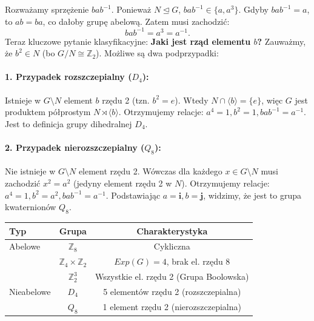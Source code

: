 Rozważamy sprzężenie $bab^{-1}$. Ponieważ $N \unlhd G$, $bab^{-1} \in \{a, a^3\}$.
Gdyby $bab^{-1} = a$, to $ab=ba$, co dałoby grupę abelową. Zatem musi zachodzić:
\[ bab^{-1} = a^3 = a^{-1}. \]
Teraz kluczowe pytanie klasyfikacyjne: \textbf{Jaki jest rząd elementu $b$?}
Zauważmy, że $b^2 \in N$ (bo $G/N \cong \mathbb{Z}_2$). Możliwe są dwa podprzypadki:

\paragraph{1. Przypadek rozszczepialny ($D_4$):}
Istnieje w $G \setminus N$ element $b$ rzędu 2 (tzn. $b^2 = e$).
Wtedy $N \cap \langle b \rangle = \{e\}$, więc $G$ jest produktem półprostym $N \rtimes \langle b \rangle$.
Otrzymujemy relacje: $a^4=1, b^2=1, bab^{-1}=a^{-1}$.
Jest to definicja grupy dihedralnej $D_4$.

\paragraph{2. Przypadek nierozszczepialny ($Q_8$):}
Nie istnieje w $G \setminus N$ element rzędu 2.
Wówczas dla każdego $x \in G \setminus N$ musi zachodzić $x^2 = a^2$ (jedyny element rzędu 2 w $N$).
Otrzymujemy relacje: $a^4=1, b^2=a^2, bab^{-1}=a^{-1}$.
Podstawiając $a=\mathbf{i}, b=\mathbf{j}$, widzimy, że jest to grupa kwaternionów $Q_8$.

\begin{summary}
\begin{center}
\begin{tabular}{l|c|c}
    \textbf{Typ} & \textbf{Grupa} & \textbf{Charakterystyka} \\ \hline
    Abelowe & $\mathbb{Z}_8$ & Cykliczna \\
            & $\mathbb{Z}_4 \times \mathbb{Z}_2$ & $Exp(G)=4$, brak el. rzędu 8 \\
            & $\mathbb{Z}_2^3$ & Wszystkie el. rzędu 2 (Grupa Boolowska) \\ \hline
    Nieabelowe & $D_4$ & 5 elementów rzędu 2 (rozszczepialna) \\
               & $Q_8$ & 1 element rzędu 2 (nierozszczepialna)
\end{tabular}
\end{center}
\end{summary}




